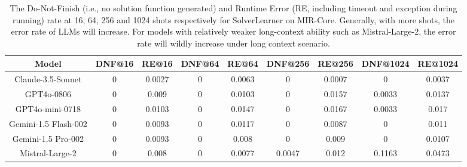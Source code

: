 \begin{table}[ht]
    \centering
    \small
    \setlength{\tabcolsep}{4pt}
    \caption{The Do-Not-Finish (i.e., no solution function generated) and Runtime Error (RE, including timeout and exception during running) rate at 16, 64, 256 and 1024 shots respectively for SolverLearner on MIR-Core. Generally, with more shots, the error rate of LLMs will increase. For models with relatively weaker long-context ability such as Mistral-Large-2, the error rate will wildly increase under long context scenario.}
    \begin{tabular}{ccccccccc}
       \toprule
        Model & DNF@16 & RE@16 & DNF@64 & RE@64 & DNF@256 & RE@256 & DNF@1024 & RE@1024 \\
        \midrule
        Claude-3.5-Sonnet & 0 & 0.0027 & 0 & 0.0063 & 0 & 0.0007 & 0 & 0.0037 \\
        GPT4o-0806  & 0 & 0.009 & 0 & 0.0103 & 0 & 0.0157 & 0.0033 & 0.0137\\
        GPT4o-mini-0718 & 0 & 0.0103 & 0 & 0.0147 & 0 & 0.0167 & 0.0033 & 0.017\\
        Gemini-1.5 Flash-002 & 0 & 0.0093 & 0 & 0.0117 & 0 & 0.0087 & 0 & 0.011  \\
        Gemini-1.5 Pro-002 & 0 & 0.0093 & 0 & 0.008 & 0 & 0.009 & 0 & 0.0107 \\
        Mistral-Large-2 & 0 & 0.008 & 0 & 0.0077 & 0.0047 & 0.012 & 0.1163 & 0.0473  \\
         \bottomrule
    \end{tabular}
    
    \label{tab:code_err}
\end{table}

